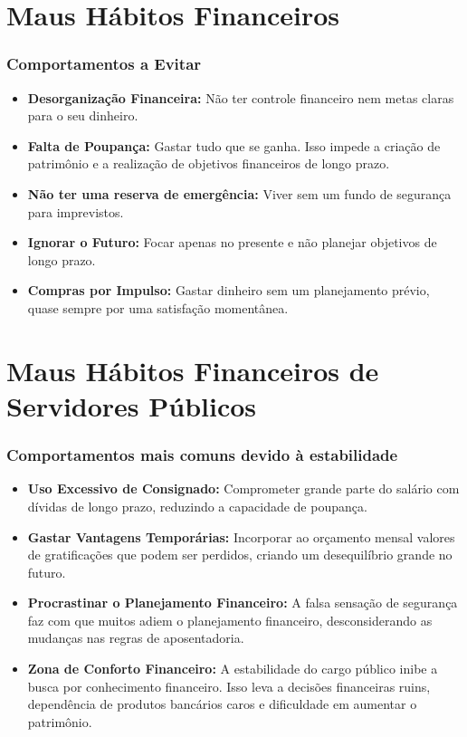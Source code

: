 \section{Maus Hábitos Financeiros}

\begin{frame}[c]\frametitle{Comportamentos a Evitar}
  \begin{itemize}
    \item \textbf{Desorganização Financeira:} Não ter controle financeiro nem metas claras para o seu dinheiro.
    \item \textbf{Falta de Poupança:} Gastar tudo que se ganha. Isso impede a criação de patrimônio e a realização de objetivos financeiros de longo prazo.
    \item \textbf{Não ter uma reserva de emergência:} Viver sem um fundo de segurança para imprevistos.
    \item \textbf{Ignorar o Futuro:} Focar apenas no presente e não planejar objetivos de longo prazo.
    \item \textbf{Compras por Impulso:} Gastar dinheiro sem um planejamento prévio, quase sempre por uma satisfação momentânea.
  \end{itemize}
\end{frame}

\section{Maus Hábitos Financeiros de Servidores Públicos}

\begin{frame}[c]\frametitle{Comportamentos mais comuns devido à estabilidade}
  \begin{itemize}
    \item \textbf{Uso Excessivo de Consignado:} Comprometer grande parte do salário com dívidas de longo prazo, reduzindo a capacidade de poupança.
    \item \textbf{Gastar Vantagens Temporárias:} Incorporar ao orçamento mensal valores de gratificações que podem ser perdidos, criando um desequilíbrio grande no futuro.
    \item \textbf{Procrastinar o Planejamento Financeiro:} A falsa sensação de segurança faz com que muitos adiem o planejamento financeiro, desconsiderando as mudanças nas regras de aposentadoria.
    \item \textbf{Zona de Conforto Financeiro:} A estabilidade do cargo público inibe a busca por conhecimento financeiro. Isso leva a decisões financeiras ruins, dependência de produtos bancários caros e dificuldade em aumentar o patrimônio.
  \end{itemize}
\end{frame}


